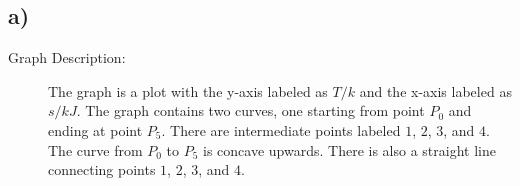 

\subsection*{a)}

\begin{description}
    \item[Graph Description:] The graph is a plot with the y-axis labeled as $T/k$ and the x-axis labeled as $s/kJ$. The graph contains two curves, one starting from point $P_0$ and ending at point $P_5$. There are intermediate points labeled $1$, $2$, $3$, and $4$. The curve from $P_0$ to $P_5$ is concave upwards. There is also a straight line connecting points $1$, $2$, $3$, and $4$.
\end{description}